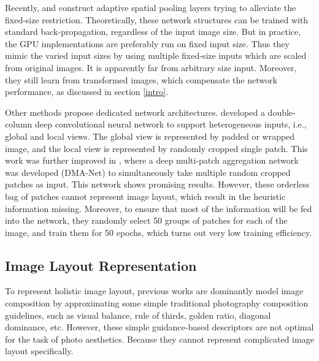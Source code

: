 \documentclass[10pt,twocolumn,letterpaper]{article}
\begin{document}
Recently, \cite{He:archive:2014} and \cite{Mai:2016:CVPR} construct adaptive spatial pooling layers trying to alleviate the fixed-size restriction. Theoretically, these network structures can be trained with standard back-propagation, regardless of the input image size. But in practice, the GPU implementations are preferably run on fixed input size. Thus they mimic the varied input sizes by using multiple fixed-size inputs which are scaled from original images. It is apparently far from arbitrary size input. Moreover, they still learn from transformed images, which compensate the network performance, as discussed in section \ref{intro}.

Other methods propose dedicated network architectures. \cite{Lu:2014:ACMMM} developed a double-column deep convolutional neural network to support heterogeneous inputs, i.e., global and local views. The global view is represented by padded or wrapped image, and the local view is represented by randomly cropped single patch. This work was further improved in \cite{Lu:2015:ICCV}, where a deep multi-patch aggregation network was developed (DMA-Net) to simultaneously take multiple random cropped patches as input. This network shows promising results. However, these orderless bag of patches cannot represent image layout, which result in the heuristic information missing. Moreover, to ensure that most of the information will be fed into the network, they randomly select 50 groups of patches for each of the image, and train them for 50 epochs, which turns out very low training efficiency.

\subsection{Image Layout Representation}
To represent holistic image layout, previous works \cite{2010:optimizing_composition,2010:ICIP:composition,2012:ICIP:composition,ICML:2012:composition,Yao:2012:oscar} are dominantly model image composition by approximating some simple traditional photography composition guidelines, such as visual balance, rule of thirds, golden ratio, diagonal dominance, etc. However, these simple guidance-based descriptors are not optimal for the task of photo aesthetics. Because they cannot represent complicated image layout specifically. 
\end{document}
